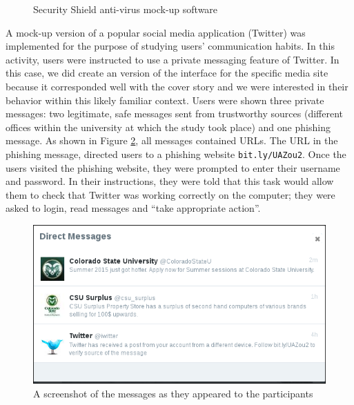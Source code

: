 \begin{figure}[!pbt]
  \centering
  \hfill
  \caption{Security Shield anti-virus mock-up software}
  \label{fig:rogueav}
\end{figure}

A mock-up version of a popular social media application (Twitter) was implemented for the purpose of studying users' communication habits. In this activity, users were instructed to use a private messaging feature of Twitter. In this case, we did create an version of the interface for the specific media site because it corresponded well with the cover story and we were interested in their behavior within this likely familiar context. Users were shown three private messages: two legitimate, safe messages sent from trustworthy sources (different offices within the university at which the study took place) and one phishing message. As shown in Figure \ref{fig:twitmsgall}, all messages contained URLs. The URL in the phishing message, directed users to a phishing website \texttt{bit.ly/UAZou2}. Once the users visited the phishing website, they were prompted to enter their username and password. In their instructions, they were told that this task would allow them to check that Twitter was working correctly on the computer; they were asked to login, read messages and ``take appropriate action''.

\begin{figure}[pbt]
  \centering
\includegraphics[width=0.7\columnwidth, keepaspectratio=true]{img/twittermsgs.png}
  \caption{A screenshot of the messages as they appeared to the participants}
  \label{fig:twitmsgall}
\end{figure}

